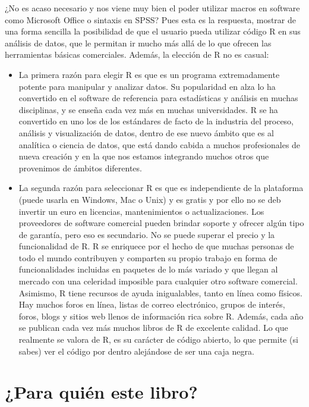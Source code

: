 \documentclass[
]{book}
\begin{document}
¿No es acaso necesario y nos viene muy bien el poder utilizar macros en software como Microsoft Office o sintaxis en SPSS? Pues esta es la respuesta, mostrar de una forma sencilla la posibilidad de que el usuario pueda utilizar código R \citep{R} en sus análisis de datos, que le permitan ir mucho más allá de lo que ofrecen las herramientas básicas comerciales. Además, la elección de R no es casual:

\begin{itemize}
\item
  La primera razón para elegir R es que es un programa extremadamente potente para manipular y analizar datos. Su popularidad en alza lo ha convertido en el software de referencia para estadísticas y análisis en muchas disciplinas, y se enseña cada vez más en muchas universidades. R se ha convertido en uno los de los estándares de facto de la industria del proceso, análisis y visualización de datos, dentro de ese nuevo ámbito que es al analítica o ciencia de datos, que está dando cabida a muchos profesionales de nueva creación y en la que nos estamos integrando muchos otros que provenimos de ámbitos diferentes.
\item
  La segunda razón para seleccionar R es que es independiente de la plataforma (puede usarla en Windows, Mac o Unix) y es gratis y por ello no se deb invertir un euro en licencias, mantenimientos o actualizaciones. Los proveedores de software comercial pueden brindar soporte y ofrecer algún tipo de garantía, pero eso es secundario. No se puede superar el precio y la funcionalidad de R. R se enriquece por el hecho de que muchas personas de todo el mundo contribuyen y comparten su propio trabajo en forma de funcionalidades incluidas en paquetes de lo más variado y que llegan al mercado con una celeridad imposible para cualquier otro software comercial. Asimismo, R tiene recursos de ayuda inigualables, tanto en línea como físicos. Hay muchos foros en línea, listas de correo electrónico, grupos de interés, foros, blogs y sitios web llenos de información rica sobre R. Además, cada año se publican cada vez más muchos libros de R de excelente calidad. Lo que realmente se valora de R, es su carácter de código abierto, lo que permite (si sabes) ver el código por dentro alejándose de ser una caja negra.
\end{itemize}

\hypertarget{para-quiuxe9n-este-libro}{%
\section{¿Para quién este libro?}\label{para-quiuxe9n-este-libro}}
\end{document}
